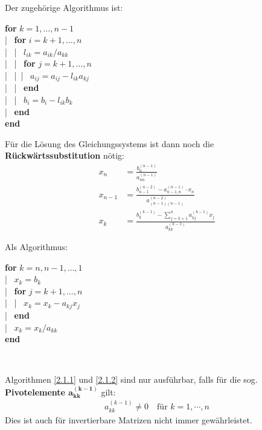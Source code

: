 Der zugehörige Algorithmus ist:

\begin{pseudocode}{0.5\linewidth}
  \textbf{for} $ k = 1, \dots , n-1$\\
  |~	\> \textbf{for} $i = k + 1, \dots , n$ \\
  |~	\> |~\> $l_{ik} = a_{ik} /a_{kk}$\\
  |~	\> |~\> \textbf{for} $j = k + 1, \dots , n$ \\
  |~	\> |~\>|~\> $a_{ij} = a_{ij} - l_{ik} a_{kj} $\\
  |~	\> |~\> \textbf{end}\\
  |~	\> |~\> $b_i = b_i -  l_{ik} b_k $\\
  |~	\> \textbf{end} \\
  \textbf{end}
\end{pseudocode}

\label{2.1.2}
Für die Lösung des Gleichungssystems ist dann noch die
\textbf{Rückwärtssubstitution}  nötig:
\begin{align}
  x_n &= \frac{b_n^{(n-1)}}{a_{nn}^{(n-1)}} \label{II.1.5} \\
  x_{n-1} &=  \frac{b_{n-1}^{(n-2)}-a_{n-1,n}^{(n-1)}\cdot x_n}
            {a_{(n-1)(n-1)}^{(n-2)}} \label{II.1.6} \\
  x_k &= \frac{b_k^{(k-1)}-\sum_{j=k+1}^{n}a_{kj}^{(k-1)}x_j}
        {a_{kk}^{(k-1)}} \label{II.1.7}
\end{align}

Als Algorithmus:

\begin{pseudocode}{0.5\linewidth}
  \textbf{for} $k = n, n -1, \dots , 1$ \\
  |~		\>$x_k = b_k$ \\
  |~		\>\textbf{for} $j = k + 1, \dots , n$ \\
  |~		\>|~	$x_k = x_k - a_{kj}x_j$ \\
  |~		\>\textbf{end} \\
  |~		\>$x_k = x_k /a_{kk}$ \\
  \textbf{end}
\end{pseudocode}~\\

\begin{Beme}
  Algorithmen \ref{2.1.1} und \ref{2.1.2} sind nur ausführbar,
  falls für die sog. \textbf{Pivotelemente $\mathbf{a_{kk}^{(k-1)}}$ }  gilt:
  \begin{gather*}
    a_{kk}^{(k-1)} \neq 0 \quad   \text{für } k=1, \cdots , n
  \end{gather*}
  Dies ist auch für invertierbare Matrizen nicht immer gewährleistet.
\end{Beme}


